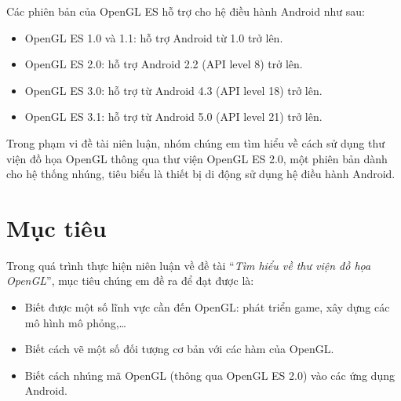 \documentclass[13pt,a4paper]{extreport}
\begin{document}
	Các phiên bản của OpenGL ES hỗ trợ cho hệ điều hành Android như sau:
		\begin{itemize}
			\item OpenGL ES 1.0 và 1.1: hỗ trợ Android từ 1.0 trở lên.
			
			\item OpenGL ES 2.0: hỗ trợ Android 2.2 (API level 8) trở lên.
			
			\item OpenGL ES 3.0: hỗ trợ từ Android 4.3 (API level 18) trở lên.
			
			\item OpenGL ES 3.1: hỗ trợ từ Android 5.0 (API level 21) trở lên.
		\end{itemize}
	
	Trong phạm vi đề tài niên luận, nhóm chúng em tìm hiểu về cách sử dụng thư viện đồ họa OpenGL thông qua thư viện OpenGL ES 2.0, một phiên bản dành cho hệ thống nhúng, tiêu biểu là thiết bị di động sử dụng hệ điều hành Android.
\section{Mục tiêu}
	Trong quá trình thực hiện niên luận về đề tài ``\emph{Tìm hiểu về thư viện đồ họa OpenGL}'', mục tiêu chúng em đề ra để đạt được là:
		\begin{itemize}
			\item Biết được một số lĩnh vực cần đến OpenGL: phát triển game, xây dựng các mô hình mô phỏng,\ldots					
			
			\item Biết cách vẽ một số đối tượng cơ bản với các hàm của OpenGL.
			
			\item Biết cách nhúng mã OpenGL (thông qua OpenGL ES 2.0) vào các ứng dụng Android.
		\end{itemize}
	
\end{document}
